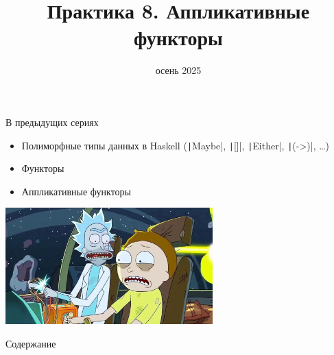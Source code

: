 
\newif\ifhandout




\title[8. Аппликативные функторы]{Практика 8. Аппликативные функторы}
\date{осень 2025}



    \mymaketitle

    \begin{frame}[fragile]{В предыдущих сериях}
        \begin{itemize}
            \item Полиморфные типы данных в Haskell (\texttt|Maybe|, \texttt|[]|, \texttt|Either|, \texttt|(->)|, \ldots)
            \item Функторы
            \item[\newtopic] Аппликативные функторы
        \end{itemize}
        \begin{center}
            \includegraphics[width=0.6\textwidth]{figs/previous}
        \end{center}
    \end{frame}

    \begin{frame}[noframenumbering]{Содержание}
        \tableofcontents
    \end{frame}

